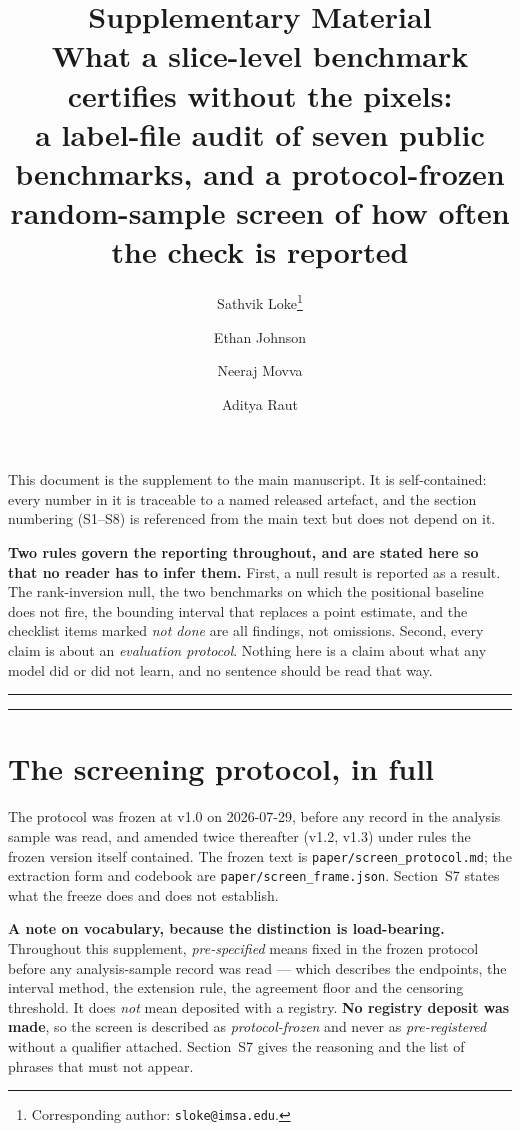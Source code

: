 \documentclass[11pt,a4paper]{article}
\title{\textbf{Supplementary Material}\\[6pt]
\large What a slice-level benchmark certifies without the pixels:\\
a label-file audit of seven public benchmarks, and a protocol-frozen\\
random-sample screen of how often the check is reported}
\author{Sathvik Loke\thanks{Corresponding author: \texttt{sloke@imsa.edu}.} \and
Ethan Johnson \and Neeraj Movva \and Aditya Raut}
\date{}
\begin{document}
\maketitle
\thispagestyle{empty}

\noindent
This document is the supplement to the main manuscript. It is self-contained: every
number in it is traceable to a named released artefact, and the section numbering
(\mbox{S1--S8}) is referenced from the main text but does not depend on it.

\medskip
\noindent
\textbf{Two rules govern the reporting throughout, and are stated here so that no
reader has to infer them.} First, a null result is reported as a result. The
rank-inversion null, the two benchmarks on which the positional baseline does not
fire, the bounding interval that replaces a point estimate, and the checklist items
marked \emph{not done} are all findings, not omissions. Second, every claim is about
an \emph{evaluation protocol}. Nothing here is a claim about what any model did or
did not learn, and no sentence should be read that way.

\vspace{4pt}
\hrule
\vspace{6pt}
\tableofcontents
\vspace{6pt}
\hrule

\clearpage

\section{The screening protocol, in full}

The protocol was frozen at v1.0 on 2026-07-29, before any record in the analysis
sample was read, and amended twice thereafter (v1.2, v1.3) under rules the frozen
version itself contained. The frozen text is
\texttt{paper/screen\_protocol.md}; the extraction form and codebook are
\texttt{paper/screen\_frame.json}. Section~S7 states what the freeze does and does not
establish.

\textbf{A note on vocabulary, because the distinction is load-bearing.} Throughout this
supplement, \emph{pre-specified} means fixed in the frozen protocol before any
analysis-sample record was read --- which describes the endpoints, the interval method,
the extension rule, the agreement floor and the censoring threshold. It does
\emph{not} mean deposited with a registry. \textbf{No registry deposit was made}, so
the screen is described as \emph{protocol-frozen} and never as \emph{pre-registered}
without a qualifier attached. Section~S7 gives the reasoning and the list of phrases
that must not appear.
\end{document}

